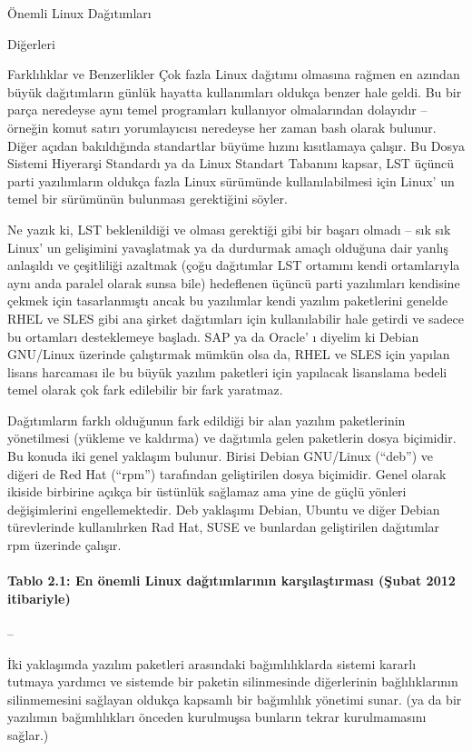 \begin{section}{Önemli Linux Dağıtımları}
\begin{subsection}{Diğerleri}
\end{subsection}
\begin{subsection}{Farklılıklar ve Benzerlikler}
\label{sec:bolum247}
Çok fazla Linux dağıtımı olmasına rağmen en azından büyük dağıtımların günlük hayatta kullanımları oldukça benzer hale geldi. Bu bir parça neredeyse aynı temel programları kullanıyor olmalarından dolayıdır – örneğin komut satırı yorumlayıcısı neredeyse her zaman bash olarak bulunur. Diğer açıdan bakıldığında standartlar büyüme hızını kısıtlamaya çalışır. Bu Dosya Sistemi Hiyerarşi Standardı ya da Linux Standart Tabanını kapsar, LST üçüncü parti yazılımların oldukça fazla Linux sürümünde kullanılabilmesi için Linux' un temel bir sürümünün bulunması gerektiğini söyler.

Ne yazık ki, LST beklenildiği ve olması gerektiği gibi bir başarı olmadı – sık sık Linux' un gelişimini yavaşlatmak ya da durdurmak amaçlı olduğuna dair yanlış anlaşıldı ve çeşitliliği azaltmak (çoğu dağıtımlar LST ortamını kendi ortamlarıyla aynı anda paralel olarak sunsa bile) hedeflenen üçüncü parti yazılımları kendisine çekmek için tasarlanmıştı ancak bu yazılımlar kendi yazılım paketlerini genelde RHEL ve SLES gibi ana şirket dağıtımları için kullanılabilir hale getirdi ve sadece bu ortamları desteklemeye başladı. SAP ya da Oracle' ı diyelim ki Debian GNU/Linux üzerinde çalıştırmak mümkün olsa da, RHEL ve SLES için yapılan lisans harcaması ile bu büyük yazılım paketleri için yapılacak lisanslama bedeli temel olarak çok fark edilebilir bir fark yaratmaz.

Dağıtımların farklı olduğunun fark edildiği bir alan yazılım paketlerinin yönetilmesi (yükleme ve kaldırma) ve dağıtımla gelen paketlerin dosya biçimidir. Bu konuda iki genel yaklaşım bulunur. Birisi Debian GNU/Linux (“deb”) ve diğeri de Red Hat (“rpm”) tarafından geliştirilen dosya biçimidir. Genel olarak ikiside birbirine açıkça bir üstünlük sağlamaz ama yine de güçlü yönleri değişimlerini engellemektedir. Deb yaklaşımı Debian, Ubuntu ve diğer Debian türevlerinde kullanılırken Rad Hat, SUSE ve bunlardan geliştirilen dağıtımlar rpm üzerinde çalışır.
\paragraph{Tablo 2.1: En önemli Linux dağıtımlarının karşılaştırması (Şubat 2012 itibariyle)}{ --}

İki yaklaşımda yazılım paketleri arasındaki bağımlılıklarda sistemi kararlı tutmaya yardımcı ve sistemde bir paketin silinmesinde diğerlerinin bağlılıklarının silinmemesini sağlayan oldukça kapsamlı bir bağımlılık yönetimi sunar. (ya da bir yazılımın bağımlılıkları önceden kurulmuşsa bunların tekrar kurulmamasını sağlar.)


\end{subsection}
\end{section}

